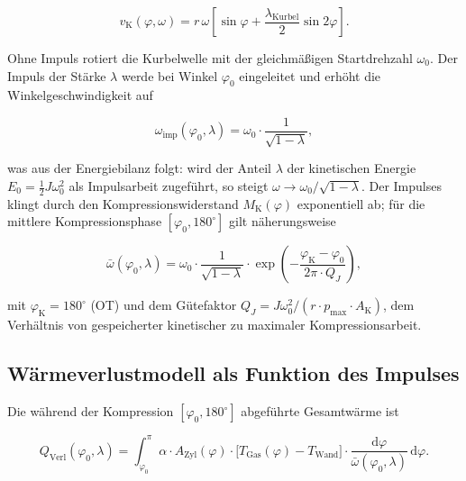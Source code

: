 ﻿\documentclass[a4paper,12pt]{article}
\begin{document}
\begin{equation}
  v_\text{K}(\varphi, \omega) = r\,\omega \left[
    \sin\varphi + \frac{\lambda_\text{Kurbel}}{2}\sin 2\varphi
  \right].
  \label{eq:vkolben}
\end{equation}

Ohne Impuls rotiert die Kurbelwelle mit der gleichmäßigen Startdrehzahl $\omega_0$.
Der Impuls der Stärke $\lambda$ werde bei Winkel $\varphi_0$ eingeleitet und erhöht
die Winkelgeschwindigkeit auf

\begin{equation}
  \omega_\text{imp}(\varphi_0, \lambda) = \omega_0 \cdot \frac{1}{\sqrt{1 - \lambda}},
  \label{eq:omega_imp}
\end{equation}

\noindent
was aus der Energiebilanz folgt: wird der Anteil $\lambda$ der kinetischen Energie
$E_0 = \frac{1}{2}J\omega_0^2$ als Impulsarbeit zugeführt, so steigt
$\omega \to \omega_0 / \sqrt{1-\lambda}$. Der Impulses klingt durch den Kompressionswiderstand
$M_\text{K}(\varphi)$ exponentiell ab; für die mittlere Kompressionsphase
$[\varphi_0, 180^\circ]$ gilt näherungsweise

\begin{equation}
  \bar{\omega}(\varphi_0, \lambda) = \omega_0 \cdot \frac{1}{\sqrt{1-\lambda}}
    \cdot \exp\!\left(-\frac{\varphi_\text{K} - \varphi_0}{2\pi \cdot Q_J}\right),
  \label{eq:omega_mittel}
\end{equation}

\noindent
mit $\varphi_\text{K} = 180^\circ$ (OT) und dem Gütefaktor
$Q_J = J\omega_0^2 / (r \cdot p_\text{max} \cdot A_\text{K})$, dem Verhältnis von
gespeicherter kinetischer zu maximaler Kompressionsarbeit.

\subsection{Wärmeverlustmodell als Funktion des Impulses}

Die während der Kompression $[\varphi_0, 180^\circ]$ abgeführte Gesamtwärme ist

\begin{equation}
  Q_\text{Verl}(\varphi_0, \lambda) =
    \int_{\varphi_0}^{\pi}
      \alpha \cdot A_\text{Zyl}(\varphi) \cdot
      \bigl[T_\text{Gas}(\varphi) - T_\text{Wand}\bigr]
      \cdot \frac{\mathrm{d}\varphi}{\bar{\omega}(\varphi_0,\lambda)}
    \,\mathrm{d}\varphi.
  \label{eq:qverl_integral}
\end{equation}
\end{document}
